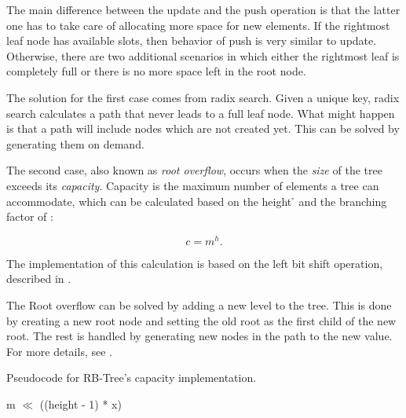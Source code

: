 The main difference between the update and the push operation is that the latter one has to take care of allocating more space for new elements. If the rightmost leaf node has available slots, then behavior of push is very similar to update. Otherwise, there are two additional scenarios in which either the rightmost leaf is completely full or there is no more space left in the root node. 

The solution for the first case comes from radix search. Given a unique key, radix search calculates a path that never leads to a full leaf node. What might happen is that a path will include nodes which are not created yet. This can be solved by generating them on demand. 

The second case, also known as \emph{root overflow}, occurs when the \emph{size} of the tree exceeds its \emph{capacity}. Capacity is the maximum number of elements a tree can accommodate, which can be calculated based on the height \h{} and the branching factor \m{} of \rbtree{}:

\begin{equation}
	c = m^h.
\end{equation}

The implementation of this calculation is based on the left bit shift operation, described in . 

The Root overflow can be solved by adding a new level to the tree. This is done by creating a new root node and setting the old root as the first child of the new root. The rest is handled by generating new nodes in the path to the new value. For more details, see . 

\begin{listing}[ht!]        
    \caption{Pseudocode for RB-Tree's capacity implementation.}
    \label{lst:rb-tree-capacity}
    
    \begin{algorithmic}
		\State \Return m $\ll$ ((height - 1) * x)
        \EndFunction
    \end{algorithmic}
\end{listing}

